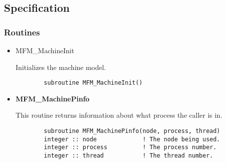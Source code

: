 \subsection{Specification}

\subsubsection{Routines}

\begin{itemize}

\item{MFM\_MachineInit}

Initializes the machine model.

\begin{verbatim}
        subroutine MFM_MachineInit()
\end{verbatim}

\item{\bf MFM\_MachinePinfo}

This routine returns information about what process the caller is in.

\begin{verbatim}
        subroutine MFM_MachinePinfo(node, process, thread)
        integer :: node             ! The node being used.      
        integer :: process          ! The process number.
        integer :: thread           ! The thread number.
\end{verbatim}

\end{itemize}